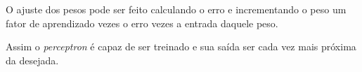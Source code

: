 O ajuste dos pesos pode ser feito calculando o erro e incrementando o peso um fator de
aprendizado vezes o erro vezes a entrada daquele peso.

Assim o \textit{perceptron} é capaz de ser treinado e sua saída ser cada vez mais próxima da desejada.



